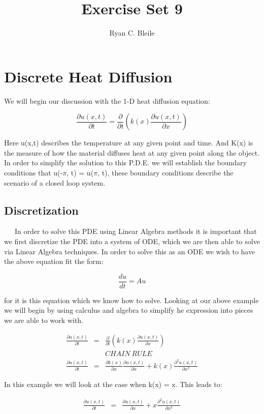 \documentclass[12pt]{article}
\title{Exercise Set 9}
\author{Ryan C. Bleile}
\begin{document}
\maketitle
\newpage

\section*{Discrete Heat Diffusion}

We will begin our discussion with the 1-D heat diffusion equation: 

\[ \frac{\partial u(x,t)}{\partial t} = \frac{\partial}{\partial t}(k(x) \frac{\partial u(x,t)}{\partial x}) \] 

Here u(x,t) describes the temperature at any given point and time. And K(x) is the measure of how the material diffuses heat at any given point along the object. In order to simplify the solution to this P.D.E. we will establish the boundary conditions that u(-$\pi$, t) = u($\pi$, t), these boundary conditions describe the scenario of a closed loop system.

\subsection*{Discretization}

\ \ \ In order to solve this PDE using Linear Algebra methods it is important that we first discretize the PDE into a system of ODE, which we are then able to solve via Linear Algebra techniques. In order to solve this as an ODE we wish to have the above equation fit the form:

\[ \frac{du}{dt} = Au  \]

for it is this equation which we know how to solve. Looking at our above example we will begin by using calculus and algebra to simplify he expression into pieces we are able to work with.

\begin{eqnarray*}
\frac{\partial u(x,t)}{\partial t} &=& \frac{\partial}{\partial t}(k(x) \frac{\partial u(x,t)}{\partial x})\\
&& CHAIN\ RULE\\
\frac{\partial u(x,t)}{\partial t} &=& \frac{\partial k(x)}{\partial x}\frac{\partial u(x,t)}{\partial x}+k(x)\frac{\partial^2 u(x,t)}{\partial x^2}
\end{eqnarray*}

In this example we will look at the case when k(x) = x. This leads to:

\begin{eqnarray*}
\frac{\partial u(x,t)}{\partial t} &=& \frac{\partial u(x,t)}{\partial x}+ x\frac{\partial^2 u(x,t)}{\partial x^2}
\end{eqnarray*}
\end{document}
